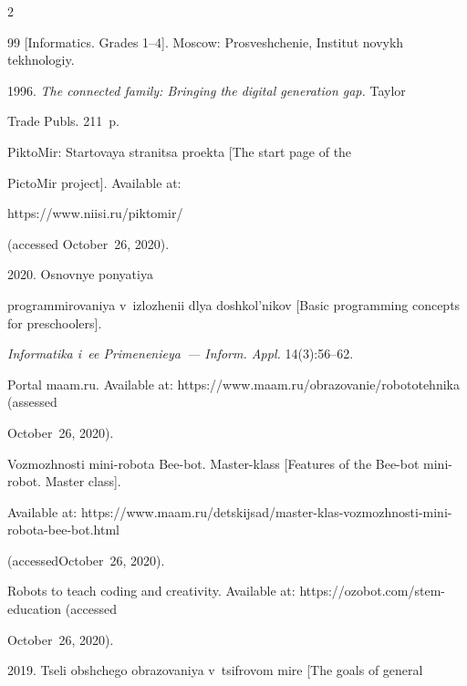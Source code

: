 \begin{multicols}{2}
{{\begin{thebibliography}{99}
 [Informatics. Grades 1--4]. Moscow: Prosveshchenie, Institut novykh tekhnologiy. 




 1996. \textit{The connected family: Bringing the digital generation gap.} Taylor 


Trade Publs. 211~p.





\columnbreak







PiktoMir: Startovaya stranitsa proekta [The start page of the 


PictoMir project]. Available at: {\sf 


https://www.niisi.\linebreak ru/piktomir/} (accessed October~26, 2020).




 2020. Osnovnye ponyatiya 


programmirovaniya v~iz\-lo\-zhe\-nii dlya doshkol'nikov [Basic programming concepts for preschoolers]. 


\textit{Informatika i~ee Pri\-me\-ne\-nieya~--- Inform. Appl.} 14(3):56--62.




Portal maam.ru. Available at: {\sf  https://www.maam.ru/\linebreak obrazovanie/robototehnika} (assessed 


October~26, 2020).




Vozmozhnosti mini-robota Bee-bot. Master-klass [Features of the Bee-bot mini-robot. Master class]. 


Available at: {\sf https://www.maam.ru/detskijsad/master-klas-vozmozhnosti-mini-robota-bee-bot.html} 


(accessed\linebreak October~26, 2020).




Robots to teach coding and creativity. Available at: {\sf https://ozobot.com/stem-education} (accessed 


October~26, 2020).




 2019. Tseli obshchego obrazovaniya v~tsif\-ro\-vom mire [The goals of general 



\end{thebibliography}}}
\end{multicols}
